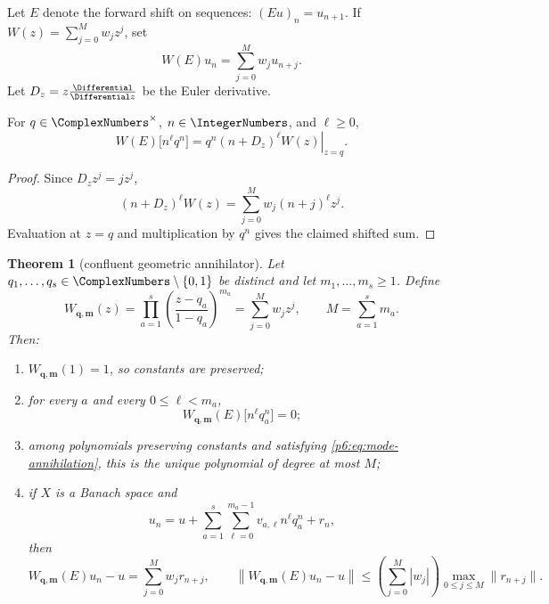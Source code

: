 \documentclass[11pt]{article}
\numberwithin{equation}{section}
\newtheorem{theorem}{Theorem}[section]
\theoremstyle{definition}
\theoremstyle{remark}
\begin{document}
Let $E$ denote the forward shift on sequences: $(Eu)_n=u_{n+1}$.  If
$W(z)=\sum_{j=0}^{M}w_jz^j$, set
\[
 W(E)u_n=\sum_{j=0}^{M}w_ju_{n+j}.
\]
Let $D_z=z\frac{\Differential}{\Differential z}$ be the Euler derivative.

\begin{lemma}
\label{p6:lem:shift-euler}
For $q\in\ComplexNumbers^\times$, $n\in\IntegerNumbers$, and $\ell\ge0$,
\begin{equation}
 W(E)\bigl[n^\ell q^n\bigr]
 =q^n\left.(n+D_z)^\ell W(z)\right|_{z=q}.
 \label{p6:eq:shift-euler}
\end{equation}
\end{lemma}

\begin{proof}
Since $D_zz^j=jz^j$,
\[
 (n+D_z)^\ell W(z)
 =\sum_{j=0}^{M}w_j(n+j)^\ell z^j.
\]
Evaluation at $z=q$ and multiplication by $q^n$ gives the claimed shifted sum.
\end{proof}

\begin{theorem}[confluent geometric annihilator]
\label{p6:thm:confluent-annihilator}
Let $q_1,\ldots,q_s\in\ComplexNumbers\setminus\{0,1\}$ be distinct and let
$m_1,\ldots,m_s\ge1$.  Define
\begin{equation}
 W_{\bm q,\bm m}(z)
 =\prod_{a=1}^{s}\left(\frac{z-q_a}{1-q_a}\right)^{m_a}
 =\sum_{j=0}^{M}w_jz^j,
 \qquad M=\sum_{a=1}^{s}m_a.
 \label{p6:eq:minimal-confluent}
\end{equation}
Then:
\begin{enumerate}
\item $W_{\bm q,\bm m}(1)=1$, so constants are preserved;
\item for every $a$ and every $0\le\ell<m_a$,
\begin{equation}
 W_{\bm q,\bm m}(E)\bigl[n^\ell q_a^n\bigr]=0;
 \label{p6:eq:mode-annihilation}
\end{equation}
\item among polynomials preserving constants and satisfying
\eqref{p6:eq:mode-annihilation}, this is the unique polynomial of degree at most $M$;
\item if $X$ is a Banach space and
\begin{equation}
 u_n=u+\sum_{a=1}^{s}\sum_{\ell=0}^{m_a-1}v_{a,\ell}n^\ell q_a^n+r_n,
 \label{p6:eq:banach-mode-expansion}
\end{equation}
then
\begin{equation}
 W_{\bm q,\bm m}(E)u_n-u
 =\sum_{j=0}^{M}w_jr_{n+j},
 \qquad
 \left\|W_{\bm q,\bm m}(E)u_n-u\right\|
 \le\left(\sum_{j=0}^{M}|w_j|\right)
 \max_{0\le j\le M}\|r_{n+j}\|.
 \label{p6:eq:banach-remainder}
\end{equation}
\end{enumerate}
\end{theorem}
\end{document}
